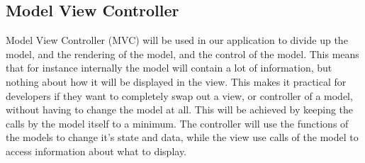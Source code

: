 \subsection{Model View Controller}
Model View Controller (MVC) will be used in our application to divide up the model, and the rendering of the model, and the control of the model. This means that for instance internally the model will contain a lot of information, but nothing about how it will be displayed in the view. This makes it practical for developers if they want to completely swap out a view, or controller of a model, without having to change the model at all. This will be achieved by keeping the calls by the model itself to a minimum. The controller will use the functions of the models to change it's state and data, while the view use calls of the model to access information about what to display.